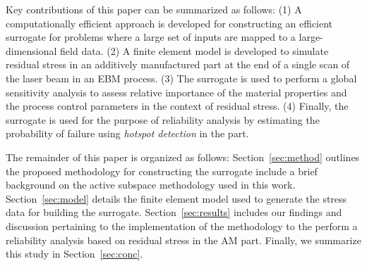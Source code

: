 Key contributions of this paper can be summarized as follows: (1) A computationally efficient approach is developed
for constructing an efficient surrogate for problems where a large set of inputs are mapped to a large-dimensional
field data. (2) A finite element model is developed to simulate residual stress in an additively manufactured part
at the end of a single scan of the laser beam in an EBM process. (3) The surrogate is used to perform a global
sensitivity analysis to assess relative importance of the material properties and the process control parameters
in the context of residual stress. (4) Finally, the surrogate is used for the purpose of reliability analysis by estimating the
probability of failure using \textit{hotspot detection} in the part. 

The remainder of this paper is organized as follows: Section~\ref{sec:method} outlines the proposed methodology for
constructing the surrogate include a brief background on the active subspace methodology used in this work.
Section~\ref{sec:model} details the finite element model used to generate the stress data for building the surrogate.
Section~\ref{sec:results} includes our findings and discussion pertaining to the implementation of the methodology to
the perform a reliability analysis based on residual stress in the AM part. Finally, we summarize this study in 
Section~\ref{sec:conc}. 



